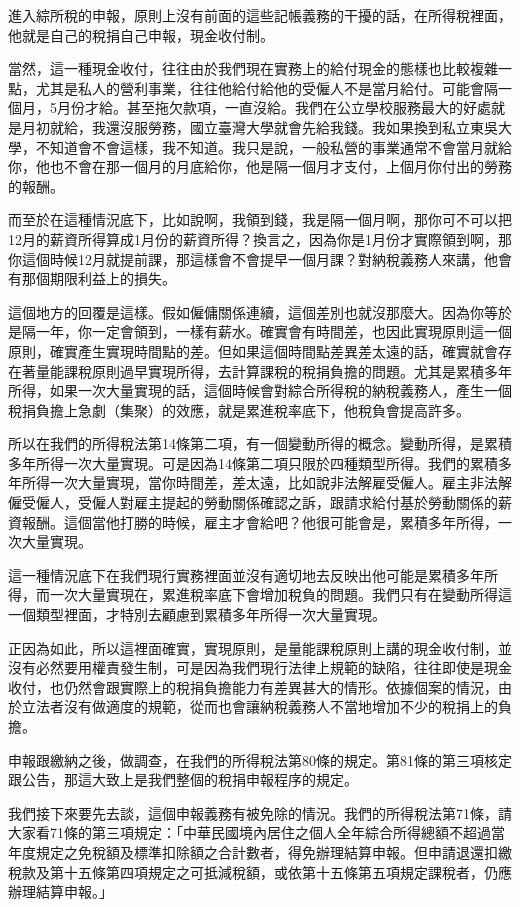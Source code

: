 \documentclass[oneside,sub3section]{ctexbook}
\begin{document}
進入綜所稅的申報，原則上沒有前面的這些記帳義務的干擾的話，在所得稅裡面，他就是自己的稅捐自己申報，現金收付制。

當然，這一種現金收付，往往由於我們現在實務上的給付現金的態樣也比較複雜一點，尤其是私人的營利事業，往往他給付給他的受僱人不是當月給付。可能會隔一個月，5月份才給。甚至拖欠款項，一直沒給。我們在公立學校服務最大的好處就是月初就給，我還沒服勞務，國立臺灣大學就會先給我錢。我如果換到私立東吳大學，不知道會不會這樣，我不知道。我只是說，一般私營的事業通常不會當月就給你，他也不會在那一個月的月底給你，他是隔一個月才支付，上個月你付出的勞務的報酬。

而至於在這種情況底下，比如說啊，我領到錢，我是隔一個月啊，那你可不可以把12月的薪資所得算成1月份的薪資所得？換言之，因為你是1月份才實際領到啊，那你這個時候12月就提前課，那這樣會不會提早一個月課？對納稅義務人來講，他會有那個期限利益上的損失。

這個地方的回覆是這樣。假如僱傭關係連續，這個差別也就沒那麼大。因為你等於是隔一年，你一定會領到，一樣有薪水。確實會有時間差，也因此實現原則這一個原則，確實產生實現時間點的差。但如果這個時間點差異差太遠的話，確實就會存在著量能課稅原則過早實現所得，去計算課稅的稅捐負擔的問題。尤其是累積多年所得，如果一次大量實現的話，這個時候會對綜合所得稅的納稅義務人，產生一個稅捐負擔上急劇（集聚）的效應，就是累進稅率底下，他稅負會提高許多。

所以在我們的所得稅法第14條第二項，有一個變動所得的概念。變動所得，是累積多年所得一次大量實現。可是因為14條第二項只限於四種類型所得。我們的累積多年所得一次大量實現，當你時間差，差太遠，比如說非法解雇受僱人。雇主非法解僱受僱人，受僱人對雇主提起的勞動關係確認之訴，跟請求給付基於勞動關係的薪資報酬。這個當他打勝的時候，雇主才會給吧？他很可能會是，累積多年所得，一次大量實現。

這一種情況底下在我們現行實務裡面並沒有適切地去反映出他可能是累積多年所得，而一次大量實現在，累進稅率底下會增加稅負的問題。我們只有在變動所得這一個類型裡面，才特別去顧慮到累積多年所得一次大量實現。

正因為如此，所以這裡面確實，實現原則，是量能課稅原則上講的現金收付制，並沒有必然要用權責發生制，可是因為我們現行法律上規範的缺陷，往往即使是現金收付，也仍然會跟實際上的稅捐負擔能力有差異甚大的情形。依據個案的情況，由於立法者沒有做適度的規範，從而也會讓納稅義務人不當地增加不少的稅捐上的負擔。

申報跟繳納之後，做調查，在我們的所得稅法第80條的規定。第81條的第三項核定跟公告，那這大致上是我們整個的稅捐申報程序的規定。

我們接下來要先去談，這個申報義務有被免除的情況。我們的所得稅法第71條，請大家看71條的第三項規定：「中華民國境內居住之個人全年綜合所得總額不超過當年度規定之免稅額及標準扣除額之合計數者，得免辦理結算申報。但申請退還扣繳稅款及第十五條第四項規定之可抵減稅額，或依第十五條第五項規定課稅者，仍應辦理結算申報。」
\end{document}
